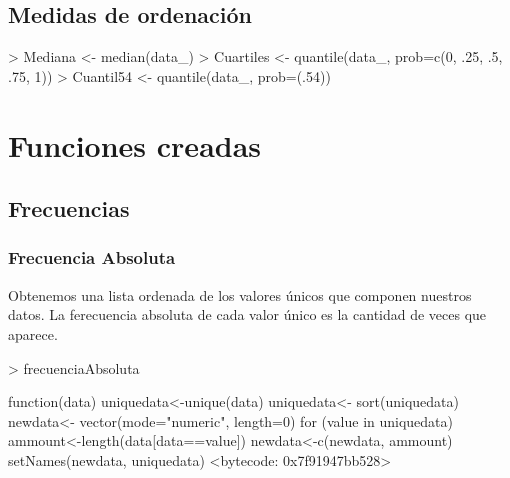 \documentclass [a4paper] {article}
\begin{document}
\subsection{Medidas de ordenación}
\begin{Schunk}
\begin{Sinput}
> Mediana <- median(data_)
> Cuartiles <- quantile(data_, prob=c(0, .25, .5, .75, 1))
> Cuantil54 <- quantile(data_, prob=(.54))
\end{Sinput}
\end{Schunk}

\newpage
\section{Funciones creadas}
\subsection{Frecuencias}
\subsubsection{Frecuencia Absoluta}
Obtenemos una lista ordenada de los valores únicos que componen nuestros datos.
La ferecuencia absoluta de cada valor único es la cantidad de veces que aparece.
\begin{Schunk}
\begin{Sinput}
> frecuenciaAbsoluta
\end{Sinput}
\begin{Soutput}
function(data){
  uniquedata<-unique(data)
  uniquedata<- sort(uniquedata)
  newdata<- vector(mode="numeric", length=0)
  for (value in uniquedata) {
    ammount<-length(data[data==value])
    newdata<-c(newdata, ammount)
  }
  setNames(newdata, uniquedata)
}
<bytecode: 0x7f91947bb528>
\end{Soutput}
\end{Schunk}
\end{document}
